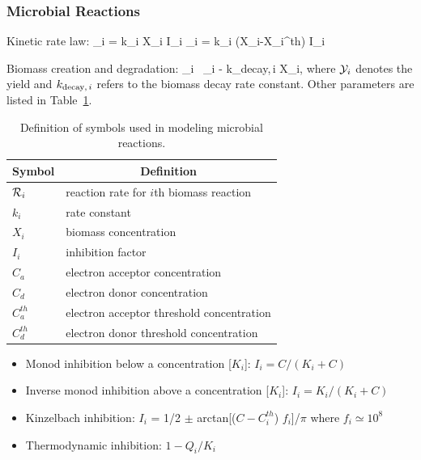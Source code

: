 \subsubsection{Microbial Reactions}

Kinetic rate law:
\EQ
\R_i = k_i X_i   I_i
\EN
\EQ
\R_i = k_i (X_i-X_i^{th})   I_i
\EN

\noindent
Biomass creation and degradation:
\EQ
{} \eq \Y_i \, \R_i - k_{{\rm decay},\,i} X_i,
\EN
where ${\mathcal Y}_i$ denotes the yield and $k_{{\rm decay},\,i}$ refers to the biomass decay rate constant. Other parameters are listed in Table~\ref{tmicrobial}.

\begin{table}[h]\centering
\caption{Definition of symbols used in modeling microbial reactions.}
\label{tmicrobial}
\vspace{3mm}
\begin{tabular}{ll}
\toprule
Symbol &  \multicolumn{1}{c}{Definition}\\
\midrule
${{\mathcal R}}_i$ & reaction rate for $i$th biomass reaction\\
$k_i$ & rate constant\\
$X_i$ & biomass concentration\\
$I_i$ & inhibition factor\\
$C_a$ & electron acceptor concentration\\
$C_d$ & electron donor concentration\\
$C_a^{th}$ & electron acceptor threshold concentration\\
$C_d^{th}$ & electron donor threshold concentration\\
\bottomrule
\end{tabular}
\end{table}

\noindent
\begin{itemize}
\item Monod inhibition below a concentration [$K_i$]: $I_i = C / (K_i + C)$\\
\item Inverse monod inhibition above a concentration [$K_i$]: $I_i = K_i / (K_i + C)$\\
\item Kinzelbach inhibition: $I_i$ = 1/2 $\pm$ arctan[($C-C_i^{th}$) $f_i$]/$\pi$ where $f _i\simeq 10^8$\\
\item Thermodynamic inhibition: $1-Q_i/K_i$
\end{itemize}

